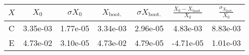 \documentclass[10pt]{article}
\begin{document}
\begin{center}
\begin{tabular}{ccccccc}
  \(X\)&\(X_0\)&\(\sigma X_0\)&\(X_\text{boot.}\)&\(\sigma X_\text{boot.}\)&\(\frac{X_0 - X_\text{boot.}}{X_0}\)&\(\frac{\sigma_{X_\text{boot.}}}{X_0}\)\\
  \hline
  C & 3.35e-03 & 1.77e-05 & 3.34e-03 & 2.96e-05 & 4.83e-03 & 8.83e-03\\
  E & 4.73e-02 & 3.10e-05 & 4.73e-02 & 4.79e-05 & -4.71e-05 & 1.01e-03
\end{tabular}
\label{Tab:1.1}
\end{center}
\end{document}
